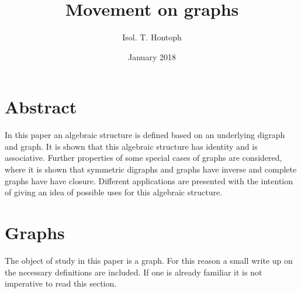 \documentclass[a4paper,11pt]{article}
\title{Movement on graphs}
\author{Isol. T. Hontoph}
\date{January 2018}
\theoremstyle{plain}
\theoremstyle{definition}
\begin{document}
\maketitle
\begin{center}
\end{center}
\newpage
\tableofcontents
\newpage
\section{Abstract}
In this paper an algebraic structure is defined based on an underlying
digraph and graph.  It is shown that this algebraic structure has identity
and is associative. Further properties of some special cases of graphs
are considered, where it is shown that symmetric digraphs and graphs have
inverse and complete graphs have have closure. Different applications
are presented with the intention of giving an idea of possible uses for
this algebraic structure.

\section{Graphs}
The object of study in this paper is a graph. For this reason a small
write up on the necessary definitions are included. If one is already
familiar it is not imperative to read this section.
\end{document}
